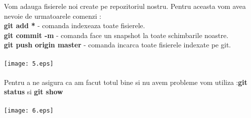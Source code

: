 \tab Vom adauga fisierele noi create pe repozitoriul nostru. Pentru aceasta vom avea nevoie de
urmatoarele comenzi :\\
\textbf{git add *} - comanda indexeaza toate fisierele.\\
\textbf{git commit -m} - comanda face un snapshot la toate schimbarile noastre.\\
\textbf{git push origin master} - comanda incarca toate fisierele indexate pe git.\\
\\
\texttt{[image: 5.eps]}
\\
\\
\tab Pentru a ne asigura ca am facut totul bine si nu avem probleme vom utiliza :\textbf{git status} si \textbf{git show}\\
\\
\texttt{[image: 6.eps]}
